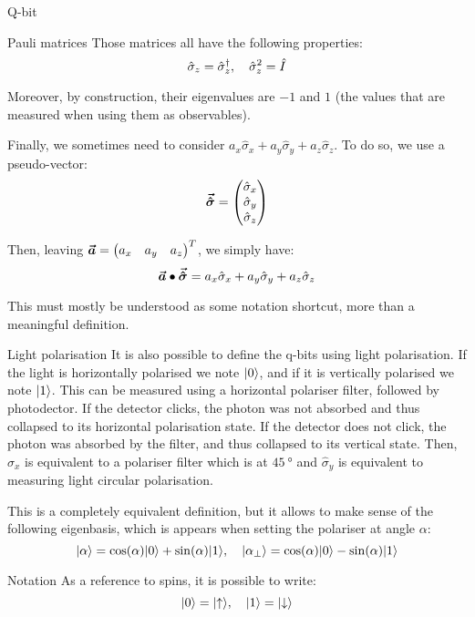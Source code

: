 \documentclass[a4paper]{article}
\begin{document}
\begin{parag}{Q-bit}
\begin{subparag}{Pauli matrices}
        Those matrices all have the following properties:
        \[\hat{\sigma}_z = \hat{\sigma}_z^{\dagger}, \quad \hat{\sigma}_z^2 = \hat{I}\]

        Moreover, by construction, their eigenvalues are $-1$ and $1$ (the values that are measured when using them as observables).

        Finally, we sometimes need to consider $a_x \hat{\sigma}_x + a_y \hat{\sigma}_y + a_z \hat{\sigma}_z$. To do so, we use a pseudo-vector: 
        \[\bm{\protect\vec{\hat{\sigma}}} = \begin{pmatrix} \hat{\sigma}_x \\ \hat{\sigma}_y \\ \hat{\sigma}_z \end{pmatrix} \]
        
        Then, leaving $\bm{\protect\vec{a}} = \begin{pmatrix} a_x & a_y & a_z \end{pmatrix} ^T$, we simply have: 
        \[\bm{\protect\vec{a}} \bullet \bm{\protect\vec{\hat{\sigma}}} = a_x \hat{\sigma}_x + a_y \hat{\sigma}_y + a_z \hat{\sigma}_z\]
        
        This must mostly be understood as some notation shortcut, more than a meaningful definition.
    \end{subparag}

    \begin{subparag}{Light polarisation}
        It is also possible to define the q-bits using light polarisation. If the light is horizontally polarised we note $\ket{0}$, and if it is vertically polarised we note $\ket{1}$. This can be measured using a horizontal polariser filter, followed by photodector. If the detector clicks, the photon was not absorbed and thus collapsed to its horizontal polarisation state. If the detector does not click, the photon was absorbed by the filter, and thus collapsed to its vertical state. Then, $\hat{\sigma}_x$ is equivalent to a polariser filter which is at $\SI{45}{\degree}$ and $\hat{\sigma}_y$ is equivalent to measuring light circular polarisation.

        This is a completely equivalent definition, but it allows to make sense of the following eigenbasis, which is appears when setting the polariser at angle $\alpha$:
        \[\ket{\alpha} = \cos\left(\alpha\right) \ket{0} + \sin\left(\alpha\right)\ket{1}, \mathspace \ket{\alpha_{\perp}} = \cos\left(\alpha\right) \ket{0} - \sin\left(\alpha\right) \ket{1}\]
    \end{subparag}

    \begin{subparag}{Notation}
        As a reference to spins, it is possible to write: 
        \[\ket{0} = \ket{\uparrow}, \mathspace \ket{1} = \ket{\downarrow}\]
    \end{subparag}
\end{parag}
\end{document}
